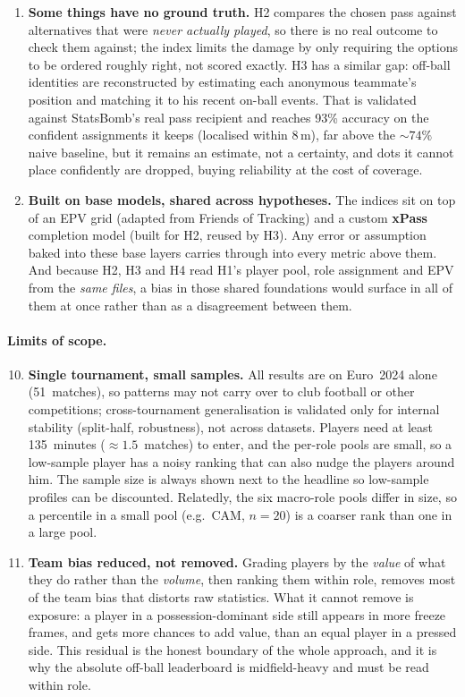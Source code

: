\documentclass[12pt,a4paper]{article}
\begin{document}
\begin{enumerate}
    \item \textbf{Some things have no ground truth.} H2 compares the chosen pass against alternatives that were \emph{never actually played}, so there is no real outcome to check them against; the index limits the damage by only requiring the options to be ordered roughly right, not scored exactly. H3 has a similar gap: off-ball identities are reconstructed by estimating each anonymous teammate's position and matching it to his recent on-ball events. That is validated against StatsBomb's real pass recipient and reaches 93\% accuracy on the confident assignments it keeps (localised within 8\,m), far above the ${\sim}74\%$ naive baseline, but it remains an estimate, not a certainty, and dots it cannot place confidently are dropped, buying reliability at the cost of coverage.

    \item \textbf{Built on base models, shared across hypotheses.} The indices sit on top of an EPV grid (adapted from Friends of Tracking) and a custom \textbf{xPass} completion model (built for H2, reused by H3). Any error or assumption baked into these base layers carries through into every metric above them. And because H2, H3 and H4 read H1's player pool, role assignment and EPV from the \emph{same files}, a bias in those shared foundations would surface in all of them at once rather than as a disagreement between them.
\end{enumerate}

\paragraph{Limits of scope.}
\begin{enumerate}\setcounter{enumi}{9}
    \item \textbf{Single tournament, small samples.}\label{lim:single-tournament} All results are on Euro~2024 alone (51~matches), so patterns may not carry over to club football or other competitions; cross-tournament generalisation is validated only for internal stability (split-half, robustness), not across datasets. Players need at least 135~minutes ($\approx 1.5$~matches) to enter, and the per-role pools are small, so a low-sample player has a noisy ranking that can also nudge the players around him. The sample size is always shown next to the headline so low-sample profiles can be discounted. Relatedly, the six macro-role pools differ in size, so a percentile in a small pool (e.g.\ CAM, $n=20$) is a coarser rank than one in a large pool.

    \item \textbf{Team bias reduced, not removed.} Grading players by the \emph{value} of what they do rather than the \emph{volume}, then ranking them within role, removes most of the team bias that distorts raw statistics. What it cannot remove is exposure: a player in a possession-dominant side still appears in more freeze frames, and gets more chances to add value, than an equal player in a pressed side. This residual is the honest boundary of the whole approach, and it is why the absolute off-ball leaderboard is midfield-heavy and must be read within role.
\end{enumerate}
\end{document}
